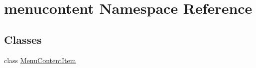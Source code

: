 \hypertarget{namespacemenucontent}{}\section{menucontent Namespace Reference}
\label{namespacemenucontent}
\subsection*{Classes}
\begin{DoxyCompactItemize}
\item 
class \hyperlink{classmenucontent_1_1MenuContentItem}{Menu\+Content\+Item}
\end{DoxyCompactItemize}
